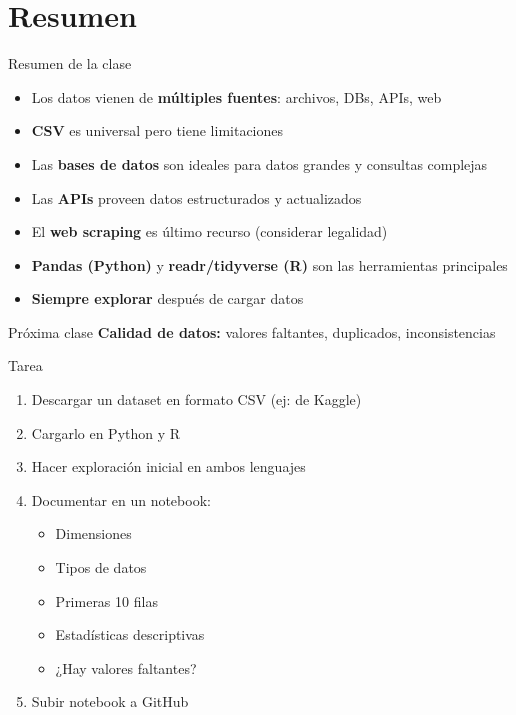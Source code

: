 \documentclass[aspectratio=169]{beamer}
\begin{document}
\section{Resumen}

\begin{frame}{Resumen de la clase}
\begin{itemize}
    \item Los datos vienen de \textbf{múltiples fuentes}: archivos, DBs, APIs, web
    \item \textbf{CSV} es universal pero tiene limitaciones
    \item Las \textbf{bases de datos} son ideales para datos grandes y consultas complejas
    \item Las \textbf{APIs} proveen datos estructurados y actualizados
    \item El \textbf{web scraping} es último recurso (considerar legalidad)
    \item \textbf{Pandas (Python)} y \textbf{readr/tidyverse (R)} son las herramientas principales
    \item \textbf{Siempre explorar} después de cargar datos
\end{itemize}

\vspace{1em}

\begin{block}{Próxima clase}
\textbf{Calidad de datos:} valores faltantes, duplicados, inconsistencias
\end{block}
\end{frame}

\begin{frame}{Tarea}
\begin{enumerate}
    \item Descargar un dataset en formato CSV (ej: de Kaggle)
    \item Cargarlo en Python y R
    \item Hacer exploración inicial en ambos lenguajes
    \item Documentar en un notebook:
    \begin{itemize}
        \item Dimensiones
        \item Tipos de datos
        \item Primeras 10 filas
        \item Estadísticas descriptivas
        \item ¿Hay valores faltantes?
    \end{itemize}
    \item Subir notebook a GitHub
\end{enumerate}
\end{frame}
\end{document}
